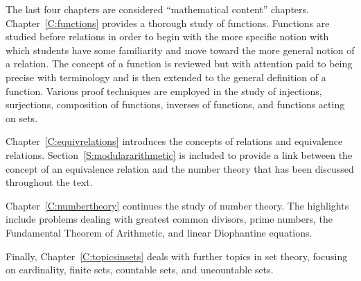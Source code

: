 The last four chapters are considered ``mathematical content'' chapters.  
Chapter~\ref{C:functions} provides a thorough study of functions.  Functions are studied before relations in order to begin with the more specific notion with which students have some familiarity and move toward the more general notion of a relation.  The concept of a function is reviewed but with attention paid to being precise with terminology and is then extended to the general definition of a function.  Various proof techniques are employed in the study of injections, surjections, composition of functions,  inverses of functions, and functions acting on sets.  

Chapter~\ref{C:equivrelations} introduces the concepts of relations and equivalence relations.  %
Section~\ref{S:modulararithmetic} is included to provide a link between the concept of an equivalence relation and the number theory that has been discussed throughout the text.  

Chapter~\ref{C:numbertheory} continues the study of number theory.  The highlights include problems dealing with greatest common divisors, prime numbers, the Fundamental Theorem of Arithmetic, and linear Diophantine equations.  

Finally, Chapter~\ref{C:topicsinsets} deals with further topics in set theory, focusing on cardinality, finite sets, countable sets, and uncountable sets.

